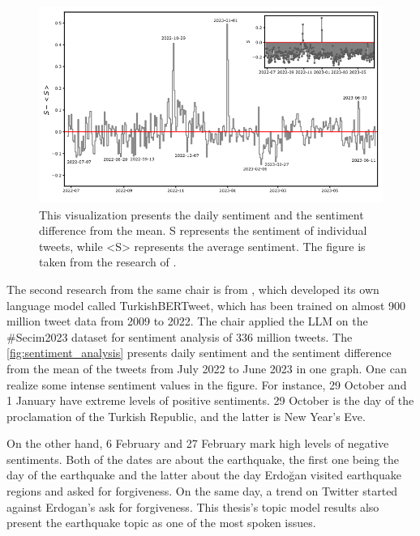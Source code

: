 \begin{figure}[h!]
    \centering
    \includegraphics[width=\linewidth]{figures/sentiment_plot.png}
    \caption[Daily Sentiment Analysis of the \#Secim2023 Dataset]
    {This visualization presents the daily sentiment and the sentiment difference from the mean. 
    S represents the sentiment of individual tweets, while <S> represents the average sentiment. 
    The figure is taken from the research of \textcite{turkishbertweet_2023}.}\label{fig:sentiment_analysis}
\end{figure}

The second research from the same chair is from \textcite{turkishbertweet_2023}, which developed its 
own language model called TurkishBERTweet, which has been trained on almost 900 million tweet data 
from 2009 to 2022. The chair applied the LLM on the \#Secim2023 dataset for sentiment analysis of 
336 million tweets. The \autoref{fig:sentiment_analysis} presents daily sentiment and the sentiment 
difference from the mean of the tweets from July 2022 to June 2023 in one graph. One can realize some 
intense sentiment values in the figure. For instance, 29 October and 1 January have extreme levels of 
positive sentiments. 29 October is the day of the proclamation of the Turkish Republic, and the latter 
is New Year's Eve.

On the other hand, 6 February and 27 February mark high levels of negative sentiments. Both of the 
dates are about the earthquake, the first one being the day of the earthquake and the latter about 
the day Erdo­ğan visited earthquake regions and asked for forgiveness. On the same day, a trend on 
Twitter started against Erdogan's ask for forgiveness. This thesis's topic model results also present 
the earthquake topic as one of the most spoken issues.

